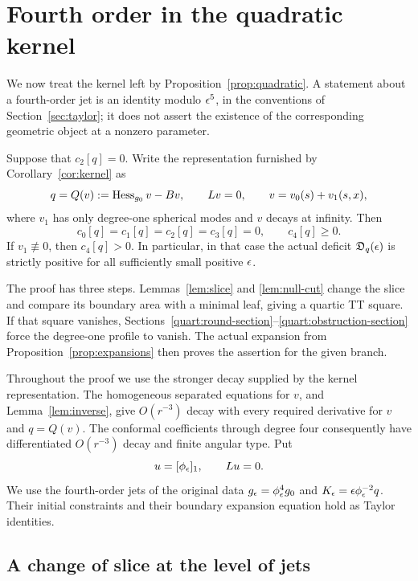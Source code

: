 \section{Fourth order in the quadratic kernel}
\label{sec:quartic}

We now treat the kernel left by Proposition~\ref{prop:quadratic}.
A statement about a fourth-order jet is an identity modulo \(\epsilon^5\),
in the conventions of Section~\ref{sec:taylor}; it does not assert the
existence of the corresponding geometric object at a nonzero parameter.

\begin{proposition}
\label{prop:quartic}
Suppose that \(c_2[q]=0\).  Write the representation furnished by
Corollary~\ref{cor:kernel} as
\[
 q=Q(v):=\operatorname{Hess}_{g_0}v-Bv,\qquad Lv=0,
 \qquad v=v_0(s)+v_1(s,x),
\]
where \(v_1\) has only degree-one spherical modes and \(v\) decays at
infinity.  Then
\[
 c_0[q]=c_1[q]=c_2[q]=c_3[q]=0,
 \qquad c_4[q]\geq 0.
\]
If \(v_1\not\equiv0\), then \(c_4[q]>0\).  In particular, in that
case the actual deficit \(\mathfrak D_q(\epsilon)\) is strictly positive
for all sufficiently small positive \(\epsilon\).
\end{proposition}

The proof has three steps. Lemmas~\ref{lem:slice} and
\ref{lem:null-cut} change the slice and compare its boundary area with
a minimal leaf, giving a quartic TT square. If that square vanishes,
Sections~\ref{quart:round-section}--\ref{quart:obstruction-section}
force the degree-one profile to vanish. The actual expansion from
Proposition~\ref{prop:expansions} then proves the assertion for the
given branch.

Throughout the proof we use the stronger decay supplied by the kernel
representation.  The homogeneous separated equations for \(v\), and
Lemma~\ref{lem:inverse}, give \(O(r^{-3})\) decay with every required
derivative for \(v\) and \(q=Q(v)\).  The conformal coefficients through
degree four consequently have differentiated \(O(r^{-3})\) decay and
finite angular type.  Put
\[
 u=[\phi_\epsilon]_1,\qquad Lu=0.
\]
We use the fourth-order jets of the original data
\(g_\epsilon=\phi_\epsilon^4g_0\) and
\(K_\epsilon=\epsilon\phi_\epsilon^{-2}q\).  Their initial constraints and their
boundary expansion equation hold as Taylor identities.

\subsection{A change of slice at the level of jets}

